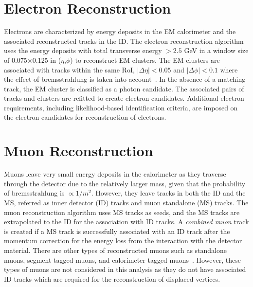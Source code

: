 \section{Electron Reconstruction}
\label{sec:reco:lep}

Electrons are characterized by energy deposits in the EM calorimeter and the associated reconstructed tracks in the ID. The electron reconstruction algorithm uses the energy deposits with total transverse energy $>2.5$ \si{\GeV} in a window size of 0.075$\times$0.125 in ($\eta$,$\phi$) to reconstruct EM clusters. The EM clusters are associated with tracks within the same RoI, $|\Delta\eta|<0.05$ and $|\Delta\phi|<0.1$ where the effect of bremsstrahlung is taken into account~\cite{Aad:2014fxa}. In the absence of a matching track, the EM cluster is classified as a photon candidate. The associated pairs of tracks and clusters are refitted to create electron candidates. Additional electron requirements, including likelihood-based identification criteria, are imposed on the electron candidates for reconstruction of electrons.


\section{Muon Reconstruction}
\label{sec:reco:muon}

Muons leave very small energy deposits in the calorimeter as they traverse through the detector due to the relatively larger mass, given that the probability of bremsstrahlung is $\propto 1/m^{2}$. However, they leave tracks in both the ID and the MS, referred as inner detector (ID) tracks and muon standalone (MS) tracks. The muon reconstruction algorithm uses MS tracks as seeds, and the MS tracks are extrapolated to the ID for the association with ID tracks. A \textit{combined muon} track is created if a MS track is successfully associated with an ID track after the momentum correction for the energy loss from the interaction with the detector material. There are other types of reconstructed muons such as standalone muons, segment-tagged muons, and calorimeter-tagged muons~\cite{Aad:2016jkr}. However, these types of muons are not considered in this analysis as they do not have associated ID tracks which are required for the reconstruction of displaced vertices.

